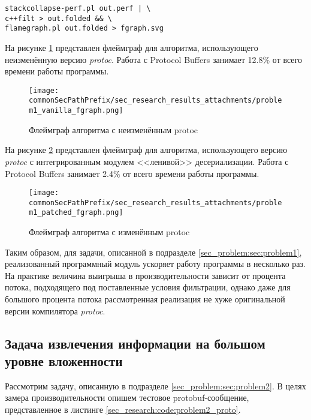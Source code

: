 \noindent\begin{minipage}{\linewidth}
\begin{lstlisting}[style=CodeListing, caption={bash-инструкция для сбора статистики утилитой perf}, label=sec_research:code:problem1_fgraph]
stackcollapse-perf.pl out.perf | \
c++filt > out.folded && \
flamegraph.pl out.folded > fgraph.svg
\end{lstlisting}
\end{minipage}

На рисунке \ref{fig:problem1_vanilla_fgraph} представлен флеймграф для алгоритма, использующего неизменённую версию \textit{protoc}. 
Работа с Protocol Buffers занимает 12.8\% от всего времени работы программы.

\begin{figure}[!ht]
    \centering
    \texttt{[image: \\commonSecPathPrefix/sec\_research\_results\_attachments/problem1\_vanilla\_fgraph.png]}
    \caption{Флеймграф алгоритма с неизменённым protoc}
    \label{fig:problem1_vanilla_fgraph}
\end{figure}

\pagebreak
На рисунке \ref{fig:problem1_patched_fgraph} представлен флеймграф для алгоритма, использующего версию \textit{protoc} с интегрированным модулем <<ленивой>> десериализации. 
Работа с Protocol Buffers занимает 2.4\% от всего времени работы программы.

\begin{figure}[!ht]
    \centering
    \texttt{[image: \\commonSecPathPrefix/sec\_research\_results\_attachments/problem1\_patched\_fgraph.png]}
    \caption{Флеймграф алгоритма с изменённым protoc}
    \label{fig:problem1_patched_fgraph}
\end{figure}

Таким образом, для задачи, описанной в подразделе \ref{sec_problem:sec:problem1}, реализованный программный модуль ускоряет работу программы в несколько раз.
На практике величина выигрыша в производительности зависит от процента потока, подходящего под поставленные условия фильтрации, однако даже для большого процента потока
рассмотренная реализация не хуже оригинальной версии компилятора \textit{protoc}.

\subsection{Задача извлечения информации на большом уровне вложенности}

Рассмотрим задачу, описанную в подразделе \ref{sec_problem:sec:problem2}.
В целях замера производительности опишем тестовое protobuf-сообщение, представленное в листинге \ref{sec_research:code:problem2_proto}.

